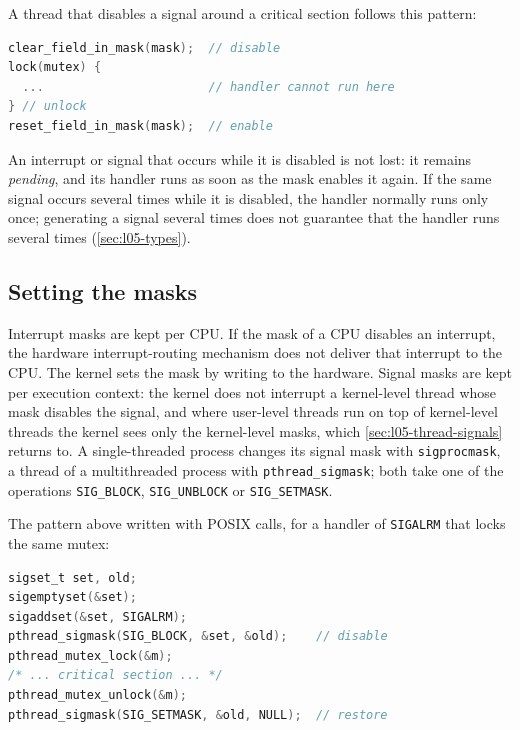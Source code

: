 \documentclass[../main.tex]{subfiles}
\begin{document}
A thread that disables a signal around a critical section follows this
pattern:
\begin{lstlisting}[language=C, numbers=none]
clear_field_in_mask(mask);  // disable
lock(mutex) {
  ...                       // handler cannot run here
} // unlock
reset_field_in_mask(mask);  // enable
\end{lstlisting}
An interrupt or signal that occurs while it is disabled is not lost: it
remains \emph{pending}, and its handler runs as soon as the mask enables it
again.  If the same signal occurs several times while it is disabled, the
handler normally runs only once; generating a signal several times does
not guarantee that the handler runs several times (\cref{sec:l05-types}).

\subsection{Setting the masks}

Interrupt masks are kept per CPU.  If the mask of a CPU disables an
interrupt, the hardware interrupt-routing mechanism does not deliver that
interrupt to the CPU.  The kernel sets the mask by writing to the
hardware.  Signal masks are kept per execution context: the kernel does
not interrupt a kernel-level thread whose mask disables the signal, and
where user-level threads run on top of kernel-level threads the kernel
sees only the kernel-level masks, which \cref{sec:l05-thread-signals}
returns to.  A single-threaded process changes its signal mask with
\texttt{sigprocmask}, a thread of a multithreaded process with
\texttt{pthread\_sigmask}; both take one of the operations
\texttt{SIG\_BLOCK}, \texttt{SIG\_UNBLOCK} or \texttt{SIG\_SETMASK}.

\begin{example}
  The pattern above written with POSIX calls, for a handler of
  \texttt{SIGALRM} that locks the same mutex:%
  \begin{lstlisting}[language=C, numbers=none]
sigset_t set, old;
sigemptyset(&set);
sigaddset(&set, SIGALRM);
pthread_sigmask(SIG_BLOCK, &set, &old);    // disable
pthread_mutex_lock(&m);
/* ... critical section ... */
pthread_mutex_unlock(&m);
pthread_sigmask(SIG_SETMASK, &old, NULL);  // restore
\end{lstlisting}
\end{example}
\end{document}
